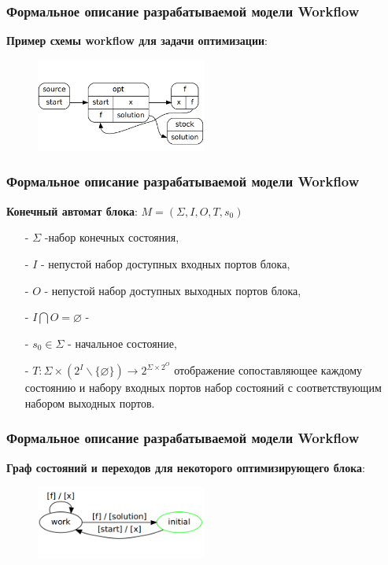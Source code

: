 \documentclass[10pt,pdf,hyperref={unicode}]{beamer}
\begin{document}
\begin{frame}
\frametitle{Формальное описание разрабатываемой модели Workflow}

\textbf{Пример схемы workflow для задачи оптимизации}:
\begin{figure}[here]
    \centering
    \includegraphics[width=0.5\textwidth]{optimization_workflow.png}
\end{figure}   
\end{frame}


\begin{frame}
\frametitle{Формальное описание разрабатываемой модели Workflow}

\textbf{Конечный автомат блока}:
 $M = (\Sigma, I, O, T, s_{0})$ 
\begin{enumerate}
\item[-] $\Sigma$ -набор конечных состояния,
\item[-] $I$ - непустой набор доступных входных портов блока,
\item[-] $O$ - непустой набор доступных выходных портов блока,
\item[-] $I \bigcap O = \varnothing$ - 
\item[-] $s_{0} \in \Sigma$ - начальное состояние,
\item[-] $T: \Sigma \times (2^{I} \backslash \lbrace \varnothing \rbrace) \rightarrow  2^{\Sigma \times 2^{O}}$ отображение сопоставляющее каждому состоянию и набору входных портов набор состояний с соответствующим набором выходных портов.
\end{enumerate}  
\end{frame}



\begin{frame}
\frametitle{Формальное описание разрабатываемой модели Workflow}

\textbf{Граф состояний и переходов для некоторого оптимизирующего блока}:
\begin{figure}[here]
    \centering
    \includegraphics[width=0.5\textwidth]{optimizer_block.png}
\end{figure}  
\end{frame}
\end{document}
